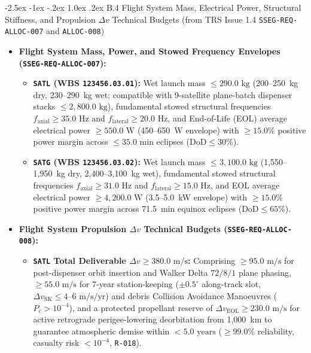 \documentclass[11pt,a4paper]{article}
\makeatletter
\renewcommand\subsection{\@startsection{subsection}{2}{\z@}%
    {-2.5ex \@plus -1ex \@minus -.2ex}%
    {1.0ex \@plus .2ex}%
    {\normalfont\large\bfseries\sffamily\color{SubHeadingBlue}}}
\providecommand{\abbr}[1]{#1}
\makeatother
\begin{document}
\subsection{B.4 Flight System Mass, Electrical Power, Structural Stiffness, and Propulsion \texorpdfstring{$\Delta v$}{Delta-v} Technical Budgets (from TRS Issue 1.4 \texttt{SSEG-REQ-ALLOC-007} and \texttt{ALLOC-008})}

\begin{itemize}
    \item \textbf{Flight System Mass, Power, and Stowed Frequency Envelopes (\texttt{SSEG-REQ-ALLOC-007}):}
    \begin{itemize}
        \item \textbf{\texttt{SATL} (\abbr{WBS} \texttt{123456.03.01}):} Wet launch mass $\le 290.0\text{ kg}$ (200--250~kg dry, 230--290~kg wet; compatible with 9-satellite plane-batch dispenser stacks $\le 2{,}800.0\text{ kg}$), fundamental stowed structural frequencies $f_{\text{axial}} \ge 35.0\text{ Hz}$ and $f_{\text{lateral}} \ge 20.0\text{ Hz}$, and End-of-Life (\abbr{EOL}) average electrical power $\ge 550.0\text{ W}$ (450--650~W envelope) with $\ge 15.0\%$ positive power margin across $\le 35.0\text{ min}$ eclipses ($\text{DoD} \le 30\%$).
        \item \textbf{\texttt{SATG} (\abbr{WBS} \texttt{123456.03.02}):} Wet launch mass $\le 3{,}100.0\text{ kg}$ (1,550--1,950~kg dry, 2,400--3,100~kg wet), fundamental stowed structural frequencies $f_{\text{axial}} \ge 31.0\text{ Hz}$ and $f_{\text{lateral}} \ge 15.0\text{ Hz}$, and \abbr{EOL} average electrical power $\ge 4{,}200.0\text{ W}$ (3.5--5.0~kW envelope) with $\ge 15.0\%$ positive power margin across 71.5~min equinox eclipses ($\text{DoD} \le 65\%$).
    \end{itemize}
    \item \textbf{Flight System Propulsion $\Delta v$ Technical Budgets (\texttt{SSEG-REQ-ALLOC-008}):}
    \begin{itemize}
        \item \textbf{\texttt{SATL} Total Deliverable $\Delta v \ge 380.0\text{ m/s}$:} Comprising $\ge 95.0\text{ m/s}$ for post-dispenser orbit insertion and Walker Delta $72/8/1$ plane phasing, $\ge 55.0\text{ m/s}$ for 7-year station-keeping ($\pm 0.5^\circ$ along-track slot, $\Delta v_{\text{SK}} \le 4\text{--}6\text{ m/s/yr}$) and debris Collision Avoidance Manoeuvres ($P_c > 10^{-4}$), and a protected propellant reserve of $\Delta v_{\text{EOL}} \ge 230.0\text{ m/s}$ for active retrograde perigee-lowering deorbitation from 1,000~km to guarantee atmospheric demise within $< 5.0\text{ years}$ ($\ge 99.0\%$ reliability, casualty risk $< 10^{-4}$, \texttt{R-018}).

\end{itemize}
\end{itemize}
\end{document}

